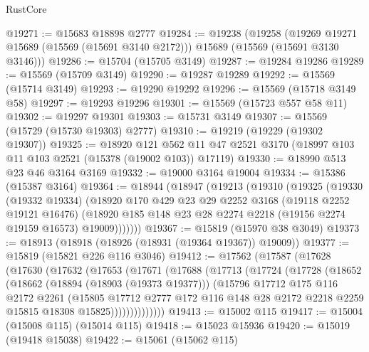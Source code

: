 \begin{lexlean}{RustCore}
\begin{coremodule}
@19271 := @15683 @18898 @2777
@19284 := @19238
    (@19258
      (@19269 @19271 @15689 (@15569 (@15691 @3140 @2172)))
      @15689
      (@15569 (@15691 @3130 @3146)))
@19286 := @15704 (@15705 @3149)
@19287 := @19284 @19286
@19289 := @15569 (@15709 @3149)
@19290 := @19287 @19289
@19292 := @15569 (@15714 @3149)
@19293 := @19290 @19292
@19296 := @15569 (@15718 @3149 @58)
@19297 := @19293 @19296
@19301 := @15569 (@15723 @557 @58 @11)
@19302 := @19297 @19301
@19303 := @15731 @3149
@19307 := @15569 (@15729 (@15730 @19303) @2777)
@19310 := @19219 (@19229 (@19302 @19307))
@19325 := @18920
    @121
    @562
    @11
    @47
    @2521
    @3170
    (@18997 @103 @11 @103 @2521 (@15378 (@19002 @103)) @17119)
@19330 := @18990 @513 @23 @46 @3164 @3169
@19332 := @19000 @3164 @19004
@19334 := @15386 (@15387 @3164)
@19364 := @18944
    (@18947
      (@19213
        (@19310
          (@19325
            (@19330
              (@19332 @19334)
              (@18920
                @170
                @429
                @23
                @29
                @2252
                @3168
                (@19118 @2252 @19121 @16476)
                (@18920 @185 @148 @23 @28 @2274 @2218 (@19156 @2274 @19159 @16573) @19009)))))))
@19367 := @15819 (@15970 @38 @3049)
@19373 := @18913 (@18918 (@18926 (@18931 (@19364 @19367)) @19009))
@19377 := @15819 (@15821 @226 @116 @3046)
@19412 := @17562
    (@17587
      (@17628
        (@17630
          (@17632
            (@17653
              (@17671
                (@17688
                  (@17713
                    (@17724
                      (@17728
                        (@18652
                          (@18662
                            (@18894 (@18903 (@19373 @19377)))
                            (@15796
                              @17712
                              @175
                              @116
                              @2172
                              @2261
                              (@15805
                                @17712
                                @2777
                                @172
                                @116
                                @148
                                @28
                                @2172
                                @2218
                                @2259
                                @15815
                                @18308
                                @15825))))))))))))))
@19413 := @15002 @115
@19417 := @15004 (@15008 @115) (@15014 @115)
@19418 := @15023 @15936
@19420 := @15019 (@19418 @15038)
@19422 := @15061 (@15062 @115)

\end{coremodule}
\end{lexlean}

